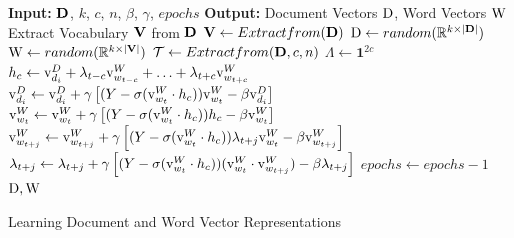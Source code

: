 \begin{algorithm}[h]
\begin{algorithmic}[1]
 \State \textbf{Input: } $\mathbf{D}$, $k$, $c$, $n$, $\beta$, $\gamma$, $epochs$
 \State \textbf{Output: } Document Vectors $\mathrm{D}$, Word Vectors $\mathrm{W}$ 
 \State Extract Vocabulary $\mathbf{V}$ from $\mathbf{D}$
 \State $\mathbf{V} \gets Extractfrom(\mathbf{D})$ 
 \State $\mathrm{D} \gets random(\mathbb{R}^{k \times |\mathbf{D}|})$
 \State $\mathrm{W} \gets random(\mathbb{R}^{k \times |\mathbf{V}|})$
 \State $\mathcal{T} \gets Extract from (\mathbf{D}, c, n)$ 
 \State $\Lambda \gets \mathbf{1}^{2c}$ 
  \State $h_{c} \gets \mathrm{v}^{D}_{d_{i}} + \lambda_{t-c}\mathrm{v}^{W}_{w_{t-c}} + \ldots + \lambda_{t+c}\mathrm{v}^{W}_{w_{t+c}}$
  \State $\mathrm{v}^{D}_{d_{i}} \gets \mathrm{v}^{D}_{d_{i}} + \gamma \left[ (Y - \sigma(\mathrm{v}^{W}_{w_{t}} \cdot h_{c}))\mathrm{v}^{W}_{w_{t}} - \beta\mathrm{v}^{D}_{d_{i}} \right]$
  \State $\mathrm{v}^{W}_{w_{t}} \gets \mathrm{v}^{W}_{w_{t}} + \gamma \left[ (Y - \sigma(\mathrm{v}^{W}_{w_{t}} \cdot h_{c})) h_{c} - \beta\mathrm{v}^{W}_{w_{t}} \right]$
  \State $\mathrm{v}^{W}_{w_{t+j}} \gets \mathrm{v}^{W}_{w_{t+j}} + \gamma \left[(Y - \sigma(\mathrm{v}^{W}_{w_{t}} \cdot h_{c}))\lambda_{t+j} \mathrm{v}^{W}_{w_{t}} - \beta\mathrm{v}^{W}_{w_{t+j}} \right]$
  \State $\lambda_{t+j} \gets \lambda_{t+j} + \gamma \left[ (Y - \sigma(\mathrm{v}^{W}_{w_{t}} \cdot h_{c}))(\mathrm{v}^{W}_{w_{t}} \cdot \mathrm{v}^{W}_{w_{t+j}}) -\beta\lambda_{t+j} \right]$
  \State $epochs \gets epochs - 1$
 \EndFor 
 \EndWhile
 \\
 \Return $\mathrm{D}, \mathrm{W}$
\end{algorithmic}
\caption{Learning Document and Word Vector Representations}
\label{alg:doc_embeddings}
\end{algorithm}

